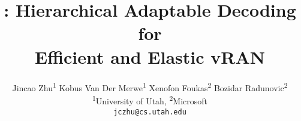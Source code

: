 \documentclass[10pt,twocolumn]{article} %
\title{%
  \textbf{\LARGE \Name{}: Hierarchical Adaptable Decoding for \\[0.3em]
  Efficient and Elastic vRAN} %
}
\author{
  Jincao Zhu\textsuperscript{1} \quad
  Kobus Van Der Merwe\textsuperscript{1} \quad
  Xenofon Foukas\textsuperscript{2} \quad
  Bozidar Radunovic\textsuperscript{2} \\
  \small{\textsuperscript{1}University of Utah, \textsuperscript{2}Microsoft} \\
  \small{\texttt{jczhu@cs.utah.edu}}
}
\date{}
\newif\ifcolormode
\begin{document}
\colormodefalse

\maketitle

\begin{abstract}

\end{abstract}








%


\balance
\end{document}
